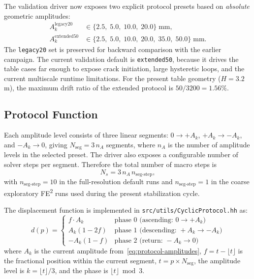The validation driver now exposes two explicit protocol presets based on
\emph{absolute} geometric amplitudes:
\begin{align}
  A_k^{\text{legacy20}} &\in \{2.5,\; 5.0,\; 10.0,\; 20.0\}\;\text{mm}, \\
  A_k^{\text{extended50}} &\in \{2.5,\; 5.0,\; 10.0,\; 20.0,\; 35.0,\; 50.0\}\;\text{mm}.
  \label{eq:protocol-amplitudes}
\end{align}
The \texttt{legacy20} set is preserved for backward comparison with the earlier
campaign.  The current validation default is \texttt{extended50}, because it
drives the table cases far enough to expose crack initiation, large hysteretic
loops, and the current multiscale runtime limitations.  For the present table
geometry ($H = 3.2$\,m), the maximum drift ratio of the extended protocol is
\(50/3200 = 1.56\%\).

\subsection{Protocol Function}

Each amplitude level consists of three linear segments:
$0 \to +A_k$, $+A_k \to -A_k$, and $-A_k \to 0$, giving
\(N_{\text{seg}} = 3\,n_A\) segments, where \(n_A\) is the number of amplitude
levels in the selected preset.  The driver also exposes a configurable number
of solver steps per segment.  Therefore the total number of macro steps is
\begin{equation}
  N_s = 3\,n_A\,n_{\text{seg-step}},
\end{equation}
with \(n_{\text{seg-step}} = 10\) in the full-resolution default runs and
\(n_{\text{seg-step}} = 1\) in the coarse exploratory FE\textsuperscript{2}
runs used during the present stabilization cycle.

The displacement function is implemented in
\texttt{src/utils/CyclicProtocol.hh} as:
\begin{equation}
  d(p) = \begin{cases}
    f \cdot A_k        & \text{phase 0 (ascending: } 0 \to +A_k\text{)} \\
    A_k(1 - 2f)        & \text{phase 1 (descending: } +A_k \to -A_k\text{)} \\
    -A_k(1 - f)        & \text{phase 2 (return: } -A_k \to 0\text{)}
  \end{cases}
  \label{eq:protocol-function}
\end{equation}
where $A_k$ is the current amplitude from~\eqref{eq:protocol-amplitudes},
$f = t - \lfloor t \rfloor$ is the fractional position within
the current segment, $t = p \times N_{\text{seg}}$, the amplitude
level is $k = \lfloor t \rfloor / 3$, and the phase is
$\lfloor t \rfloor \bmod 3$.

